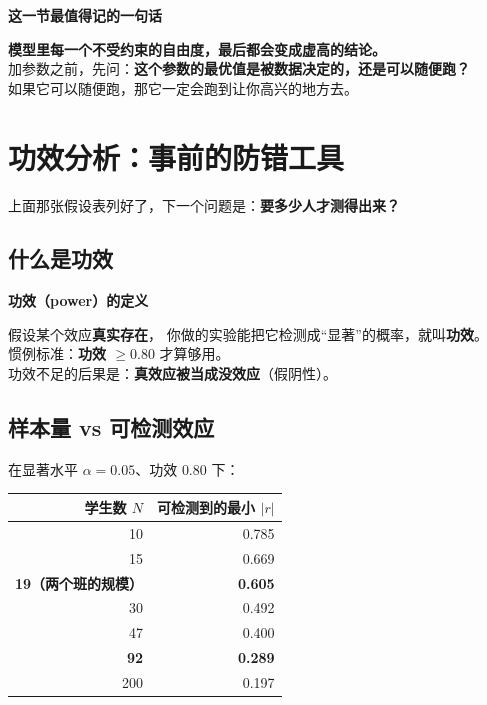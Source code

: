 \documentclass[UTF8,a4paper,11pt]{ctexart}
\newenvironment{explainbox}[1]
{\begin{center}\begin{minipage}{0.94\textwidth}\colorbox{boxbg}{\parbox{0.92\textwidth}{\textbf{#1}\par\vspace{2pt}}}}
{\end{minipage}\end{center}}
\begin{document}
\begin{explainbox}{这一节最值得记的一句话}
\textbf{模型里每一个不受约束的自由度，最后都会变成虚高的结论。}\\
加参数之前，先问：\textbf{这个参数的最优值是被数据决定的，还是可以随便跑？}\\
如果它可以随便跑，那它一定会跑到让你高兴的地方去。
\end{explainbox}

\newpage


\section{功效分析：事前的防错工具}

上面那张假设表列好了，下一个问题是：\textbf{要多少人才测得出来？}

\subsection{什么是功效}

\begin{explainbox}{功效（power）的定义}
假设某个效应\textbf{真实存在}，
你做的实验能把它检测成“显著”的概率，就叫\textbf{功效}。\\[4pt]
惯例标准：\textbf{功效 $\ge 0.80$} 才算够用。\\[4pt]
功效不足的后果是：\textbf{真效应被当成没效应}（假阴性）。
\end{explainbox}

\subsection{样本量 vs 可检测效应}

在显著水平 $\alpha=0.05$、功效 $0.80$ 下：

\begin{center}
\begin{tabular}{rr}
\toprule
\textbf{学生数 $N$} & \textbf{可检测到的最小 $\lvert r\rvert$} \\
\midrule
10 & 0.785 \\
15 & 0.669 \\
\textbf{19（两个班的规模）} & \textbf{0.605} \\
30 & 0.492 \\
47 & 0.400 \\
\textbf{92} & \textbf{0.289} \\
200 & 0.197 \\
\bottomrule
\end{tabular}
\end{center}
\end{document}
